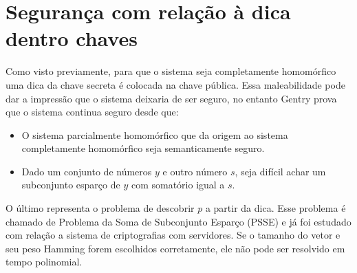 \section{Segurança com relação à dica dentro chaves}
Como visto previamente, para que o sistema seja completamente homomórfico uma dica da chave secreta é colocada na chave pública. Essa maleabilidade pode dar a impressão que o sistema deixaria de ser seguro, no entanto Gentry prova que o sistema continua seguro desde que:
\begin{itemize}
	\item O sistema parcialmente homomórfico que da origem ao sistema completamente homomórfico seja semanticamente seguro.
	\item Dado um conjunto de números $y$ e outro número $s$, seja difícil achar um subconjunto esparço de $y$ com somatório igual a $s$.
\end{itemize}
O último representa o problema de descobrir $p$ a partir da dica. Esse problema é chamado de Problema da Soma de Subconjunto Esparço (PSSE) e já foi estudado com relação a sistema de criptografias com servidores. Se o tamanho do vetor e seu peso Hamming forem escolhidos corretamente, ele não pode ser resolvido em tempo polinomial.